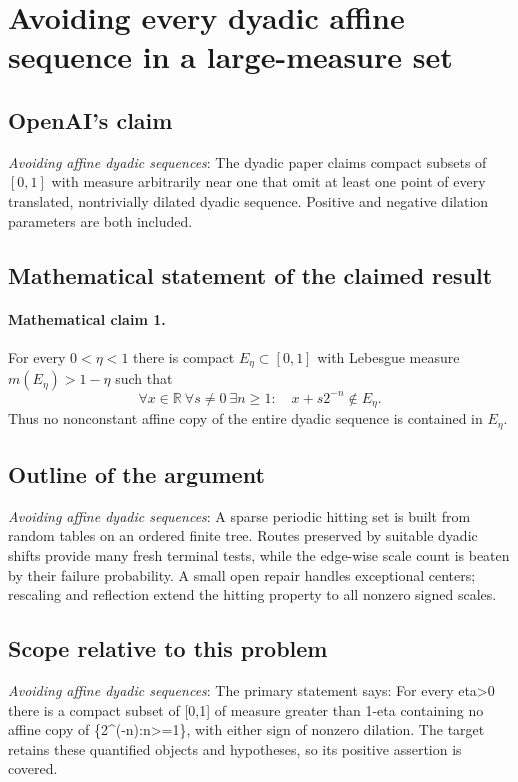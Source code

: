 \documentclass[11pt]{article}
\begin{document}
\section*{Avoiding every dyadic affine sequence in a large-measure set}

\subsection{OpenAI's claim}
\textit{Avoiding affine dyadic sequences}: The dyadic paper claims compact subsets of $[0,1]$ with measure arbitrarily near one that omit at least one point of every translated, nontrivially dilated dyadic sequence. Positive and negative dilation parameters are both included.

\subsection{Mathematical statement of the claimed result}
\paragraph{Mathematical claim 1.} For every $0<\eta<1$ there is compact $E_\eta\subset[0,1]$ with Lebesgue measure $m(E_\eta)>1-\eta$ such that \[\forall x\in\mathbb R\ \forall s\ne0\ \exists n\ge1:\quad x+s2^{-n}\notin E_\eta.\] Thus no nonconstant affine copy of the entire dyadic sequence is contained in $E_\eta$.

\subsection{Outline of the argument}
\textit{Avoiding affine dyadic sequences}: A sparse periodic hitting set is built from random tables on an ordered finite tree. Routes preserved by suitable dyadic shifts provide many fresh terminal tests, while the edge-wise scale count is beaten by their failure probability. A small open repair handles exceptional centers; rescaling and reflection extend the hitting property to all nonzero signed scales.

\subsection{Scope relative to this problem}
\textit{Avoiding affine dyadic sequences}: The primary statement says: For every eta>0 there is a compact subset of [0,1] of measure greater than 1-eta containing no affine copy of \{2\textasciicircum{}(-n):n>=1\}, with either sign of nonzero dilation. The target retains these quantified objects and hypotheses, so its positive assertion is covered.
\end{document}
